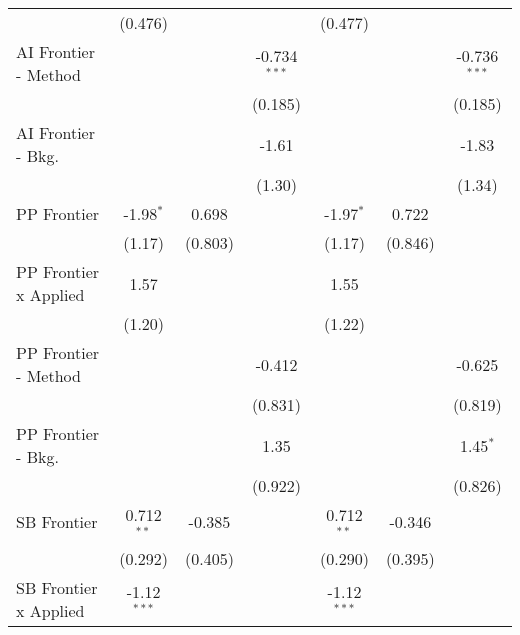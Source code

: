 \begin{tabular}{lcccccc}
                                & (0.476)       &                &                & (0.477)       &                &   \\   
   AI Frontier - Method         &               &                & -0.734$^{***}$ &               &                & -0.736$^{***}$\\   
                                &               &                & (0.185)        &               &                & (0.185)\\   
   AI Frontier - Bkg.           &               &                & -1.61          &               &                & -1.83\\   
                                &               &                & (1.30)         &               &                & (1.34)\\   
   PP Frontier                  & -1.98$^{*}$   & 0.698          &                & -1.97$^{*}$   & 0.722          &   \\   
                                & (1.17)        & (0.803)        &                & (1.17)        & (0.846)        &   \\   
   PP Frontier x Applied        & 1.57          &                &                & 1.55          &                &   \\   
                                & (1.20)        &                &                & (1.22)        &                &   \\   
   PP Frontier - Method         &               &                & -0.412         &               &                & -0.625\\   
                                &               &                & (0.831)        &               &                & (0.819)\\   
   PP Frontier - Bkg.           &               &                & 1.35           &               &                & 1.45$^{*}$\\   
                                &               &                & (0.922)        &               &                & (0.826)\\   
   SB Frontier                  & 0.712$^{**}$  & -0.385         &                & 0.712$^{**}$  & -0.346         &   \\   
                                & (0.292)       & (0.405)        &                & (0.290)       & (0.395)        &   \\   
   SB Frontier x Applied        & -1.12$^{***}$ &                &                & -1.12$^{***}$ &                &   \\   

\end{tabular}
